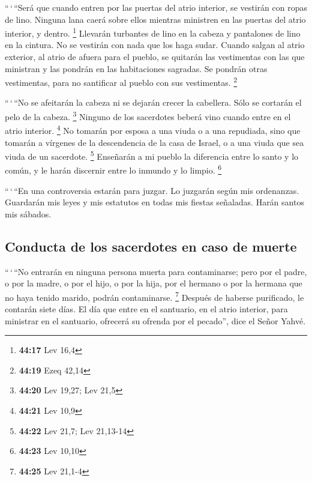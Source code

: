 \begin{paracol}{2}
 ``\,`\,``Será que cuando entren por las puertas del
atrio interior, se vestirán con ropas de lino. Ninguna lana caerá sobre
ellos mientras ministren en las puertas del atrio interior, y dentro.
\footnote{\textbf{44:17} Lev 16,4}  Llevarán turbantes de
lino en la cabeza y pantalones de lino en la cintura. No se vestirán con
nada que los haga sudar.  Cuando salgan al atrio
exterior, al atrio de afuera para el pueblo, se quitarán las vestimentas
con las que ministran y las pondrán en las habitaciones sagradas. Se
pondrán otras vestimentas, para no santificar al pueblo con sus
vestimentas. \footnote{\textbf{44:19} Ezeq 42,14}

 ``\,`\,``No se afeitarán la cabeza ni se dejarán crecer
la cabellera. Sólo se cortarán el pelo de la cabeza. \footnote{\textbf{44:20}
  Lev 19,27; Lev 21,5}  Ninguno de los sacerdotes beberá
vino cuando entre en el atrio interior. \footnote{\textbf{44:21} Lev
  10,9}  No tomarán por esposa a una viuda o a una
repudiada, sino que tomarán a vírgenes de la descendencia de la casa de
Israel, o a una viuda que sea viuda de un sacerdote. \footnote{\textbf{44:22}
  Lev 21,7; Lev 21,13-14}  Enseñarán a mi pueblo la
diferencia entre lo santo y lo común, y le harán discernir entre lo
inmundo y lo limpio. \footnote{\textbf{44:23} Lev 10,10}

 ``\,`\,``En una controversia estarán para juzgar. Lo
juzgarán según mis ordenanzas. Guardarán mis leyes y mis estatutos en
todas mis fiestas señaladas. Harán santos mis sábados.

\hypertarget{conducta-de-los-sacerdotes-en-caso-de-muerte}{%
\subsection{Conducta de los sacerdotes en caso de
muerte}\label{conducta-de-los-sacerdotes-en-caso-de-muerte}}

 ``\,`\,``No entrarán en ninguna persona muerta para
contaminarse; pero por el padre, o por la madre, o por el hijo, o por la
hija, por el hermano o por la hermana que no haya tenido marido, podrán
contaminarse. \footnote{\textbf{44:25} Lev 21,1-4} 
Después de haberse purificado, le contarán siete días. 
El día que entre en el santuario, en el atrio interior, para ministrar
en el santuario, ofrecerá su ofrenda por el pecado'', dice el Señor
Yahvé.


\end{paracol}
